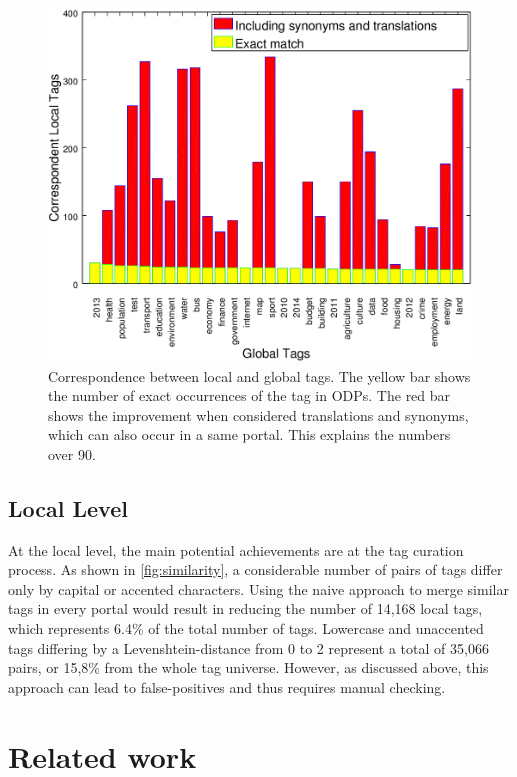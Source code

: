 \documentclass[conference]{IEEEtran}
\begin{document}
\begin{figure}[tb]
\begin{center}
\includegraphics[width=\columnwidth]{images/results_tagged_resources.png}
\caption{Correspondence between local and global tags. The yellow bar shows the number of exact occurrences of the tag in ODPs. The red bar shows the improvement when considered translations and synonyms, which can also occur in a same portal. This explains the numbers over 90. }
\label{fig:results_tagged_resources}
\end{center}
\end{figure}

\subsection{Local Level}

At the local level, the main potential achievements are at the tag curation process.
As shown in \autoref{fig:similarity}, a considerable number of pairs of tags differ only by capital or accented characters.
Using the naive approach to merge similar tags in every portal would result in reducing the number of 14,168 local tags, which represents 6.4\% of the total number of tags.
Lowercase and unaccented tags differing by a Levenshtein-distance from 0 to 2 represent a total of 35,066 pairs, or 15,8\% from the whole tag universe.
However, as discussed above, this approach can lead to false-positives and thus requires manual checking.

\section{Related work}
\label{sec:rel_works}
\end{document}
